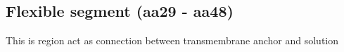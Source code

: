 \subsection{Flexible segment (aa29 - aa48)}

This is region act as connection between transmembrane anchor and solution 
